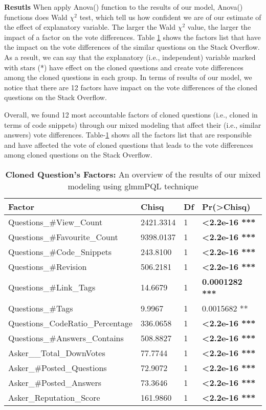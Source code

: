 \documentclass[conference]{IEEEtran}
\begin{document}
\textbf{Resutls}  When apply Anova() function to the results of our model, Anova() functions does Wald $\chi^2$ test, which tell us how confident we are of our estimate of the effect of explanatory variable. The larger the Wald $\chi^2$ value, the larger the impact of a factor on the vote differences. Table \ref{table:RQOneResutls} shows the factors list that have the impact on the vote differences of the similar questions on the Stack Overflow. As a result, we can say that the explanatory (i.e., independent) variable marked with stars (*) have effect on the cloned questions and create vote differences among the cloned questions in each group. In terms of results of our model, we notice that there are 12 factors have impact on the vote differences of the cloned questions on the Stack Overflow.

Overall, we found 12 most accountable factors of cloned questions (i.e., cloned in terms of code snippets) through our mixed modeling that affect their (i.e., similar answers) vote differences. Table-\ref{table:RQOneResutls} shows  all the factors list that are responsible and have affected the vote of cloned questions that leads to the vote differences among cloned questions on the Stack Overflow.
 \newline

\begin{table}[ht]
	\caption{\textbf{Cloned Question's Factors:} An overview of the results of our mixed modeling using \textnormal{glmmPQL} technique}
	\centering
	\begin{tabular}{l l l l}
		\hline\hline
		Factor & Chisq & Df & Pr(\textgreater Chisq) \\ [0.5ex]
		\hline
		Questions\_\#View\_Count   &    2421.3314 & 1 & \textbf{\textless 2.2e-16 ***} \\
		Questions\_\#Favourite\_Count   &     9398.0137 & 1 & \textbf{\textless 2.2e-16 ***}\\
		Questions\_\#Code\_Snippets   &  243.8100 & 1 & \textbf{\textless 2.2e-16 ***}\\
		Questions\_\#Revision &  506.2181 & 1 & \textbf{\textless 2.2e-16 ***}\\
		Questions\_\#Link\_Tags      &        14.6679 &  1 & \textbf{0.0001282 ***}\\
		Questions\_\#Tags      &         9.9967 & 1 & 0.0015682 ** \\
		Questions\_CodeRatio\_Percentage & 336.0658 &  1 &  \textbf{\textless 2.2e-16 ***}\\
		Questions\_\#Answers\_Contains      &    508.8827 & 1 & \textbf{\textless 2.2e-16 ***}\\
		Asker\_\_Total\_DownVotes     &    77.7744 & 1 & \textbf{\textless 2.2e-16 ***}\\
		Asker\_\#Posted\_Questions &  72.9072  & 1 & \textbf{\textless 2.2e-16 ***}\\
		Asker\_\#Posted\_Answers   &  73.3646 & 1 & \textbf{\textless 2.2e-16 ***}\\
		Asker\_Reputation\_Score & 161.9860 & 1 & \textbf{\textless 2.2e-16 ***}\\[1ex]
		\hline
	\end{tabular}
	\label{table:RQOneResutls}
\end{table} 
\end{document}
